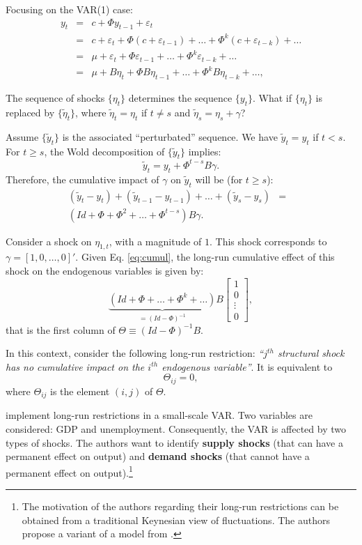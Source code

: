 \documentclass[
]{book}
\theoremstyle{definition}
\theoremstyle{definition}
\theoremstyle{definition}
\theoremstyle{definition}
\theoremstyle{remark}
\begin{document}
Focusing on the VAR(1) case:
\begin{eqnarray}
y_{t} &=& c+\Phi y_{t-1}+\varepsilon_{t}\\
& = & c+\varepsilon_{t}+\Phi(c+\varepsilon_{t-1})+\ldots+\Phi^{k}(c+\varepsilon_{t-k})+\ldots \nonumber \\
& = & \mu +\varepsilon_{t}+\Phi\varepsilon_{t-1}+\ldots+\Phi^{k}\varepsilon_{t-k}+\ldots \\
& = & \mu +B\eta_{t}+\Phi B\eta_{t-1}+\ldots+\Phi^{k}B\eta_{t-k}+\ldots,
\end{eqnarray}

The sequence of shocks \(\{\eta_t\}\) determines the sequence \(\{y_t\}\). What if \(\{\eta_t\}\) is replaced by \(\{\tilde{\eta}_t\}\), where \(\tilde{\eta}_t=\eta_t\) if \(t \ne s\) and \(\tilde{\eta}_s=\eta_s + \gamma\)?

Assume \(\{\tilde{y}_t\}\) is the associated ``perturbated'' sequence. We have \(\tilde{y}_t = y_t\) if \(t<s\). For \(t \ge s\), the Wold decomposition of \(\{\tilde{y}_t\}\) implies:
\[
\tilde{y}_t = y_t + \Phi^{t-s} B \gamma.
\]
Therefore, the cumulative impact of \(\gamma\) on \(\tilde{y}_t\) will be (for \(t \ge s\)):
\begin{eqnarray}
(\tilde{y}_t - y_t) +  (\tilde{y}_{t-1} - y_{t-1}) + \dots +  (\tilde{y}_s - y_s) &=& \nonumber \\
(Id + \Phi + \Phi^2 + \dots + \Phi^{t-s}) B \gamma.&& \label{eq:cumul}
\end{eqnarray}

Consider a shock on \(\eta_{1,t}\), with a magnitude of \(1\). This shock corresponds to \(\gamma = [1,0,\dots,0]'\). Given Eq. \eqref{eq:cumul}, the long-run cumulative effect of this shock on the endogenous variables is given by:
\[
\underbrace{(Id+\Phi+\ldots+\Phi^{k}+\ldots)}_{=(Id - \Phi)^{-1}}B\left[\begin{array}{c}
1\\
0\\
\vdots\\
0\end{array}\right],
\]
that is the first column of \(\Theta \equiv (Id - \Phi)^{-1}B\).

In this context, consider the following long-run restriction: \emph{``\(j^{th}\) structural shock has no cumulative impact on the \(i^{th}\) endogenous variable''}. It is equivalent to
\[
\Theta_{ij}=0,
\]
where \(\Theta_{ij}\) is the element \((i,j)\) of \(\Theta\).

\citet{Blanchard_Quah_1989} implement long-run restrictions in a small-scale VAR. Two variables are considered: GDP and unemployment. Consequently, the VAR is affected by two types of shocks. The authors want to identify \textbf{supply shocks} (that can have a permanent effect on output) and \textbf{demand shocks} (that cannot have a permanent effect on output).\footnote{The motivation of the authors regarding their long-run restrictions can be obtained from a traditional Keynesian view of fluctuations. The authors propose a variant of a model from \citet{Fischer_1977}.
}
\end{document}
